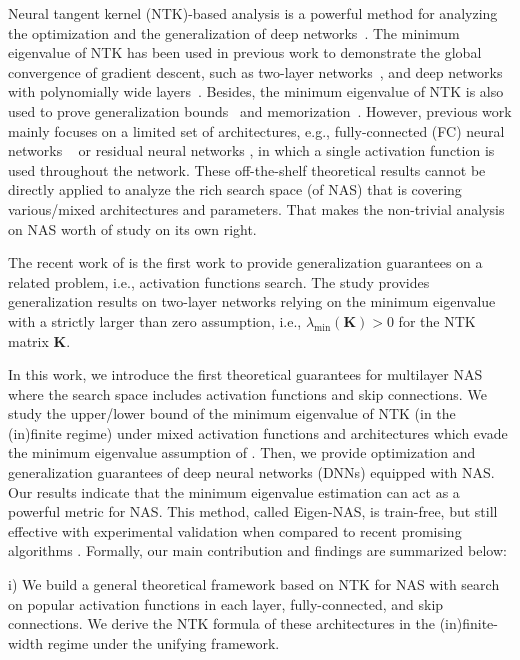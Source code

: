 \documentclass[nohyperref]{article}
\theoremstyle{plain}
\theoremstyle{definition}
\theoremstyle{remark}
\begin{document}
Neural tangent kernel (NTK)-based analysis \citep{jacot2018neural} is a powerful method for analyzing the optimization and the generalization of deep networks~\citep{pmlr-v97-allen-zhu19a, cao2019generalization, chen2020generalized, arora2019fine}. The minimum eigenvalue of NTK has been used in previous work to demonstrate the global convergence of gradient descent, such as two-layer networks~\citep{du2018gradient}, and deep networks with polynomially wide layers~\citep{pmlr-v97-allen-zhu19a}. Besides, the minimum eigenvalue of NTK is also used to prove generalization bounds~\citep{arora2019fine} and memorization~\citep{montanari2020interpolation}. However, previous work mainly focuses on a limited set of architectures, e.g., fully-connected (FC) neural networks ~\citep{allen2018learning, bartlett2017spectrally} or residual neural networks \citep{7780459,huang2020deep}, in which a single activation function is used throughout the network. These off-the-shelf theoretical results cannot be directly applied to analyze the rich search space (of NAS) that is covering various/mixed architectures and parameters. That makes the non-trivial analysis on NAS worth of study on its own right. 


The recent work of \citet{pmlr-v139-oymak21a} is the first work to provide generalization guarantees on a related problem, i.e., activation functions search. The study provides generalization results on two-layer networks relying on the minimum eigenvalue with a strictly larger than zero assumption, i.e., $\lambda_{\min}(\bm K) > 0$ for the NTK matrix $\bm K$.


In this work, we introduce the first theoretical guarantees for multilayer NAS where the search space includes activation functions and skip connections. We study the upper/lower bound of the minimum eigenvalue of NTK (in the (in)finite regime) under mixed activation functions and architectures which evade the minimum eigenvalue assumption of \citet{pmlr-v139-oymak21a}. Then, we provide optimization and generalization guarantees of deep neural networks (DNNs) equipped with NAS. 
Our results indicate that the minimum eigenvalue estimation can act as a powerful metric for NAS. This method, called Eigen-NAS, is train-free, but still effective with experimental validation when compared to recent promising algorithms \citep{pmlr-v139-xu21m, chen2021neural, mellor2021neural}. Formally, our main contribution and findings are summarized below:




i) We build a general theoretical framework based on NTK for NAS with search on popular activation functions in each layer, fully-connected, and skip connections. We derive the NTK formula of these architectures in the (in)finite-width regime under the unifying framework.
\end{document}
